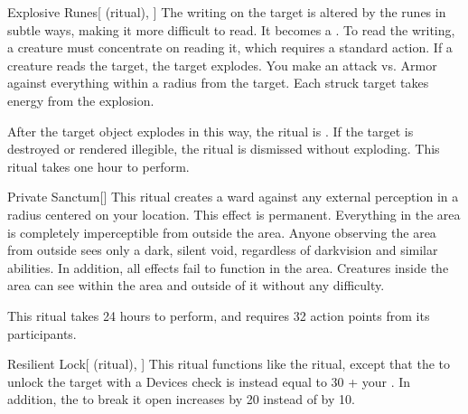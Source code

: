 \lowercase{\hypertarget{spell:Explosive Runes}{}}\label{spell:Explosive Runes}
\begin{attuneability}[Rank 4]{\hypertarget{spell:Explosive Runes}{Explosive Runes}}[ (ritual), ]
The writing on the target is altered by the runes in subtle ways, making it more difficult to read.
It becomes a .
To read the writing, a creature must concentrate on reading it, which requires a standard action.
If a creature reads the target, the target explodes.
You make an attack vs. Armor against everything within a \areamed radius from the target.
Each struck target takes energy  from the explosion.

After the target object explodes in this way, the ritual is .
If the target is destroyed or rendered illegible, the ritual is dismissed without exploding.
This ritual takes one hour to perform.
\end{attuneability}
\vspace{0.25em}



\lowercase{\hypertarget{spell:Private Sanctum}{}}\label{spell:Private Sanctum}
\begin{apability}[Rank 5]{\hypertarget{spell:Private Sanctum}{Private Sanctum}}[]
\targetrule
This ritual creates a ward against any external perception in a \arealarge radius  centered on your location.
This effect is permanent.
Everything in the area is completely imperceptible from outside the area.
Anyone observing the area from outside sees only a dark, silent void, regardless of darkvision and similar abilities.
In addition, all  effects fail to function in the area.
Creatures inside the area can see within the area and outside of it without any difficulty.

This ritual takes 24 hours to perform, and requires 32 action points from its participants.
\end{apability}
\vspace{0.25em}



\lowercase{\hypertarget{spell:Resilient Lock}{}}\label{spell:Resilient Lock}
\begin{attuneability}[Rank 5]{\hypertarget{spell:Resilient Lock}{Resilient Lock}}[ (ritual), ]
This ritual functions like the  ritual, except that the  to unlock the target with a Devices check is instead equal to 30 + your .
In addition, the  to break it open increases by 20 instead of by 10.
\end{attuneability}
\vspace{0.25em}


